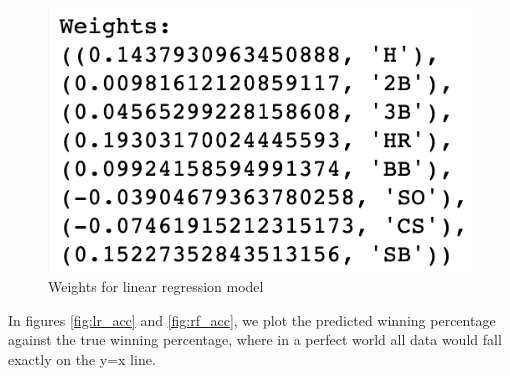 \documentclass{article}
\begin{document}
    
        
    \begin{figure}[h!]
    \begin{center}
      \includegraphics[scale=.105]{weights.png}
      \end{center}
      \caption{Weights for linear regression model}
      \label{fig:weights}
    \end{figure}
    
    In figures \ref{fig:lr_acc} and \ref{fig:rf_acc}, we plot the predicted winning percentage against the true winning percentage, where in a perfect world all data would fall exactly on the y=x line.
    
\end{document}
